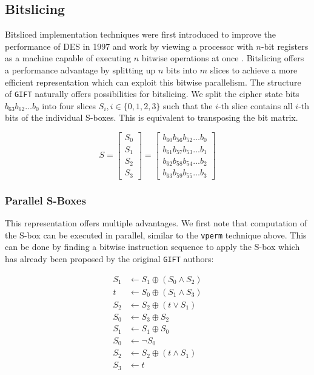 \subsection{Bitslicing}

Bitsliced implementation techniques were first introduced to improve the
performance of DES in 1997 and work by viewing a processor with $n$-bit
registers as a machine capable of executing $n$ bitwise operations at
once \cite{desslicing:1997}. Bitslicing offers a performance advantage by
splitting up $n$ bits into $m$ slices to achieve a more efficient
representation which can exploit this bitwise parallelism. The structure of
\texttt{GIFT} naturally offers possibilities for bitslicing. We split the
cipher state bits $b_{63}b_{62}\dots b_0$ into four slices $S_i,
i\in\{0,1,2,3\}$ such that the $i$-th slice contains all $i$-th bits of the
individual S-boxes. This is equivalent to transposing the bit matrix.

\[
    S=\begin{bmatrix}
        S_0\\
        S_1\\
        S_2\\
        S_3
    \end{bmatrix}
    =\begin{bmatrix}
        b_{60}b_{56}b_{52}\dots b_0\\
        b_{61}b_{57}b_{53}\dots b_1\\
        b_{62}b_{58}b_{54}\dots b_2\\
        b_{63}b_{59}b_{55}\dots b_3
    \end{bmatrix}
\]

\subsubsection{Parallel S-Boxes}

This representation offers multiple advantages. We first note that computation
of the S-box can be executed in parallel, similar to the \texttt{vperm}
technique above. This can be done by finding a bitwise instruction sequence to
apply the S-box which has already been proposed by the original \texttt{GIFT}
authors:

\begin{align*}
    S_1&\leftarrow S_1\oplus (S_0\land S_2) \\
    t&\leftarrow S_0\oplus (S_1\land S_3) \\
    S_2&\leftarrow S_2\oplus (t\lor S_1) \\
    S_0&\leftarrow S_3\oplus S_2 \\
    S_1&\leftarrow S_1\oplus S_0 \\
    S_0&\leftarrow \lnot S_0 \\
    S_2&\leftarrow S_2\oplus (t\land S_1) \\
    S_3&\leftarrow t
\end{align*}

